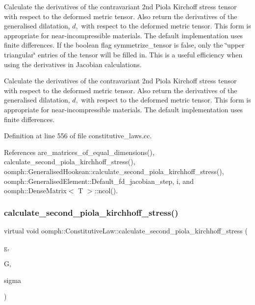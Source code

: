 Calculate the derivatives of the contravariant 2nd Piola Kirchoff stress tensor with respect to the deformed metric tensor. Also return the derivatives of the generalised dilatation, $ d, $ with respect to the deformed metric tensor. This form is appropriate for near-\/incompressible materials. The default implementation uses finite differences. If the boolean flag symmetrize\+\_\+tensor is false, only the \char`\"{}upper  triangular\char`\"{} entries of the tensor will be filled in. This is a useful efficiency when using the derivatives in Jacobian calculations. 

Calculate the derivatives of the contravariant 2nd Piola Kirchoff stress tensor with respect to the deformed metric tensor. Also return the derivatives of the generalised dilatation, $ d, $ with respect to the deformed metric tensor. This form is appropriate for near-\/incompressible materials. The default implementation uses finite differences. 

Definition at line 556 of file constitutive\+\_\+laws.\+cc.



References are\+\_\+matrices\+\_\+of\+\_\+equal\+\_\+dimensions(), calculate\+\_\+second\+\_\+piola\+\_\+kirchhoff\+\_\+stress(), oomph\+::\+Generalised\+Hookean\+::calculate\+\_\+second\+\_\+piola\+\_\+kirchhoff\+\_\+stress(), oomph\+::\+Generalised\+Element\+::\+Default\+\_\+fd\+\_\+jacobian\+\_\+step, i, and oomph\+::\+Dense\+Matrix$<$ T $>$\+::ncol().

\mbox{\label{classoomph_1_1ConstitutiveLaw_a93527d910de908035feb8f41b0401065}} 
\subsubsection{\texorpdfstring{calculate\+\_\+second\+\_\+piola\+\_\+kirchhoff\+\_\+stress()}{calculate\_second\_piola\_kirchhoff\_stress()}\hspace{0.1cm}{\footnotesize\ttfamily [1/3]}}
{\footnotesize\ttfamily virtual void oomph\+::\+Constitutive\+Law\+::calculate\+\_\+second\+\_\+piola\+\_\+kirchhoff\+\_\+stress (\begin{DoxyParamCaption}\item[{const \hyperlink{classoomph_1_1DenseMatrix}{Dense\+Matrix}$<$ double $>$ \&}]{g,  }\item[{const \hyperlink{classoomph_1_1DenseMatrix}{Dense\+Matrix}$<$ double $>$ \&}]{G,  }\item[{\hyperlink{classoomph_1_1DenseMatrix}{Dense\+Matrix}$<$ double $>$ \&}]{sigma }\end{DoxyParamCaption})\hspace{0.3cm}{\ttfamily [pure virtual]}}



